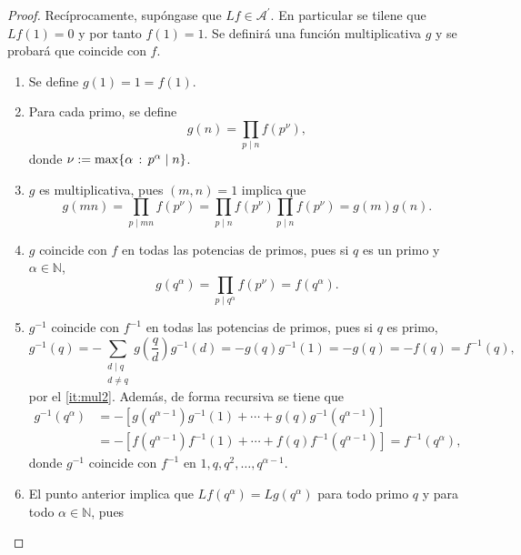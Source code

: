 \begin{proof}
Recíprocamente, supóngase que $Lf \in \mathcal{A}^\prime$. En particular se tilene que $Lf(1)=0$ y por tanto $f(1)=1$. Se definirá una función multiplicativa $g$ y se probará que coincide con $f$.
\begin{enumerate}[label=\textnormal{(\arabic*)},ref=\textnormal{\arabic*}]
    \item Se define $g(1)=1=f(1)$.
    \item Para cada primo, se define
        \begin{equation*}
            g(n) = \prod_{p \mid n} f(p^\nu),
        \end{equation*}
        donde $\nu := \max \{ \alpha \, : \, p^\alpha \mid n \}$.
    \item $g$ es multiplicativa, pues $(m,n)=1$ implica que
        \begin{equation*}
            g(m n) = \prod_{p \mid m n} f(p^\nu) = \prod_{p \mid n} f(p^\nu) \prod_{p \mid n} f(p^\nu) = g(m) g(n).
        \end{equation*}
    \item \label{it:mul2} $g$ coincide con $f$ en todas las potencias de primos, pues si $q$ es un primo y $\alpha \in \mathbb{N}$,
        \begin{equation*}
            g(q^{\alpha}) = \prod_{p \mid q^{\alpha}} f(p^\nu) = f(q^{\alpha}).
        \end{equation*}
    \item $g^{-1}$ coincide con $f^{-1}$ en todas las potencias de primos, pues si $q$ es primo,
        \begin{equation*}
            g^{-1}(q) = - \sum_{\substack{d \mid q \\ d \ne q}} g \left( \frac{q}{d} \right) g^{-1}(d) = -g(q)g^{-1}(1) = -g(q) = -f(q) = f^{-1}(q),
        \end{equation*}
        por el \cref{it:mul2}. Además, de forma recursiva se tiene que
        \begin{align*}
            g^{-1}(q^\alpha) &= -[g(q^{\alpha-1})g^{-1}(1)+\cdots+g(q)g^{-1}(q^{\alpha-1})] \\
                             &= -[f(q^{\alpha-1})f^{-1}(1)+\cdots+f(q)f^{-1}(q^{\alpha-1})] = f^{-1}(q^\alpha),
        \end{align*}
        donde $g^{-1}$ coincide con $f^{-1}$ en $1,q,q^2,\ldots,q^{\alpha-1}$.
    \item El punto anterior implica que $Lf(q^\alpha)=Lg(q^\alpha)$ para todo primo $q$ y para todo $\alpha \in \mathbb{N}$, pues
        \begin{equation*}

\end{equation*}
\end{enumerate}
\end{proof}
